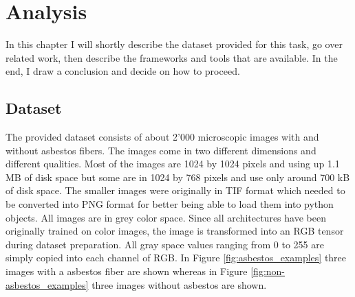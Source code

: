\chapter{Analysis}

In this chapter I will shortly describe the dataset provided for this task, go over related work, then describe the frameworks and tools that are available. In the end, I draw a conclusion and decide on how to proceed.

\section{Dataset}

The provided dataset consists of about 2'000 microscopic images with and without asbestos fibers. The images come in two different dimensions and different qualities. Most of the images are 1024 by 1024 pixels and using up 1.1 MB of disk space but some are in 1024 by 768 pixels and use only around 700 kB of disk space. The smaller images were originally in TIF format which needed to be converted into PNG format for better being able to load them into python objects. All images are in grey color space. Since all architectures have been originally trained on color images, the image is transformed into an RGB tensor during dataset preparation. All gray space values ranging from 0 to 255 are simply copied into each channel of RGB. In Figure \ref{fig:asbestos_examples} three images with a asbestos fiber are shown whereas in Figure \ref{fig:non-asbestos_examples} three images without asbestos are shown.\\


